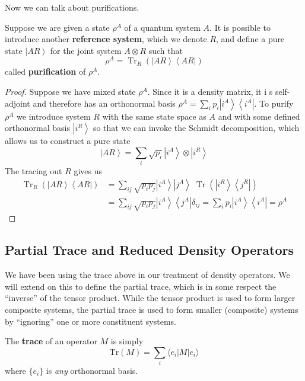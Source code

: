 \documentclass{article}
\DeclareMathOperator{\Tr}{Tr}
\newcommand{\ket}[1]{\ensuremath{\left|#1\right\rangle}}
\newcommand{\bra}[1]{\ensuremath{\left\langle#1\right|}}
\begin{document}
    Now we can talk about purifications. 

    \begin{definition}[Purifications]
      Suppose we are given a state $\rho^A$ of a quantum system $A$. It is possible to introduce another \textbf{reference system}, which we denote $R$, and define a pure state $\ket{AR}$ for the joint system $A \otimes R$ such that 
      \begin{equation}
        \rho^A = \Tr_{R} (\ket{AR}\bra{AR})
      \end{equation}
      called \textbf{purification} of $\rho^A$.
    \end{definition}
    \begin{proof}
      Suppose we have mixed state $\rho^A$. Since it is a density matrix, it i s self-adjoint and therefore has an orthonormal basis $\rho^A = \sum_i p_i \ket{i^A} \bra{i^A}$. To purify $\rho^A$ we introduce system $R$ with the same state space as $A$ and with some defined orthonormal basis $\ket{i^R}$ so that we can invoke the Schmidt decomposition, which allows us to construct a pure state 
      \begin{equation}
        \ket{AR} = \sum_i \sqrt{p_i} \ket{i^A} \otimes \ket{i^R}
      \end{equation}
      The tracing out $R$ gives us 
      \begin{align}
        \Tr_R (\ket{AR} \bra{AR}) & = \sum_{i j} \sqrt{p_i p_j} \ket{i^A} \ket{j^A} \; \Tr(\ket{i^R} \bra{j^R}) \\
                                  & = \sum_{ij} \sqrt{p_i p_j} \ket{i^A} \bra{j^A} \delta_{ij} = \sum_{i} p_i \ket{i^A} \bra{i^A} = \rho^A 
      \end{align}
    \end{proof}

  \subsection{Partial Trace and Reduced Density Operators}

    We have been using the trace above in our treatment of density operators. We will extend on this to define the partial trace, which is in some respect the ``inverse'' of the tensor product. While the tensor product is used to form larger composite systems, the partial trace is used to form smaller (composite) systems by ``ignoring'' one or more constituent systems. 

    \begin{definition}[Trace]
      The \textbf{trace} of an operator $M$ is simply 
      \begin{equation}
        \mathrm{Tr}(M) = \sum_i \langle e_i | M | e_i \rangle
      \end{equation}
      where $\{e_i\}$ is \textit{any} orthonormal basis.
    \end{definition}
\end{document}
